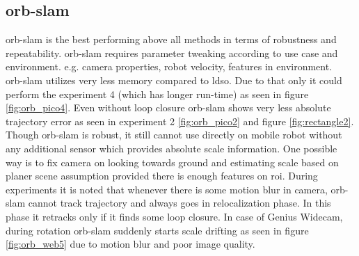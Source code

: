 \subsection{\acrshort{orb}-\acrshort{slam}}
\acrshort{orb}-\acrshort{slam} is the best performing above all methods in terms of robustness and repeatability. \acrshort{orb}-\acrshort{slam} requires parameter tweaking according to use case and environment. e.g. camera properties, robot velocity, features in environment.\\
\newline  \acrshort{orb}-\acrshort{slam} utilizes very less memory compared to \acrshort{ldso}. Due to that only it could perform the experiment 4 (which has longer run-time) as seen in figure \ref{fig:orb_pico4}. Even without loop closure \acrshort{orb}-\acrshort{slam} shows very less absolute trajectory error as seen in experiment 2 \ref{fig:orb_pico2} and figure \ref{fig:rectangle2}.\\
\newline Though \acrshort{orb}-\acrshort{slam} is robust, it still cannot use directly on mobile robot without any additional sensor which provides absolute scale information. One possible way is to fix camera on looking towards ground and estimating scale based on planer scene assumption provided there is enough features on \acrshort{roi}. During experiments it is noted that whenever there is some motion blur in camera, \acrshort{orb}-\acrshort{slam} cannot track trajectory and always goes in relocalization phase. In this phase it retracks only if it finds some loop closure. In case of Genius Widecam, during rotation \acrshort{orb}-\acrshort{slam} suddenly starts scale drifting as seen in figure \ref{fig:orb_web5} due to motion blur and poor image quality.

